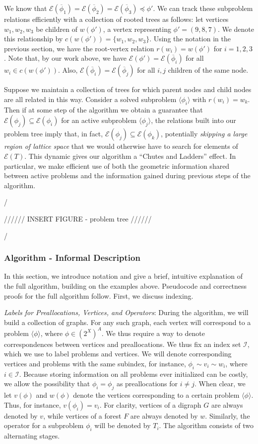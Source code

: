 \documentclass[11pt,reqno]{amsart}
\theoremstyle{definition}
\numberwithin{equation}{section}
\newcommand{\ol}{\overline}
\newcommand{\lag}{\langle}
\newcommand{\rag}{\rangle}
\newcommand{\pre}{\phi}
\newcommand{\prealloc}{(2^X)^A}
\newcommand{\sub}{\subseteq}
\newcommand{\fix}{\mathcal{E}}
\newcommand{\peq}{\preceq}
\newcommand{\toppre}{\ol{\pre}}
\begin{document}
We know that $\fix(\toppre_1) = \fix(\toppre_2) = \fix(\toppre_3) \peq \pre'$. 
We can track these subproblem relations efficiently with a collection of rooted trees as follows: let vertices $w_1,w_2,w_3$ be children of $w(\pre')$, a vertex representing $\pre' = (9,8,7)$. 
We denote this relationship by $c(w(\pre')) = \{w_1,w_2,w_3\}$.
Using the notation in the previous section, we have the root-vertex relation $r(w_i) = w(\pre')$ for $i = 1,2,3$. 
Note that, by our work above, we have $\fix(\pre') = \fix(\toppre_i)$ for all $w_i \in c(w(\pre'))$. 
Also, $\fix(\toppre_i) = \fix(\toppre_j)$ for all $i,j$ children of the same node. 

Suppose we maintain a collection of trees for which parent nodes and child nodes are all related in this way. 
Consider a solved subproblem $\lag \pre_i \rag$ with $r(w_i) = w_k$.
Then if at some step of the algorithm we obtain a guarantee that $\fix(\pre_j) \sub \fix(\pre_i)$ for an active subproblem $\lag \pre_j \rag$, the relations built into our problem tree imply that, in fact, $\fix(\pre_j) \sub \fix(\pre_k)$, potentially \emph{skipping a large region of lattice space} that we would otherwise have to search for elements of $\fix(T)$. 
This dynamic gives our algorithm a ``Chutes and Ladders'' effect. 
In particular, we make efficient use of both the geometric information shared between active problems and the information gained during previous steps of the algorithm. 

/

////// INSERT FIGURE - problem tree //////

/

\subsubsection{Algorithm - Informal Description} 

In this section, we introduce notation and give a brief, intuitive explanation of the full algorithm, building on the examples above.
Pseudocode and correctness proofs for the full algorithm follow. 
First, we discuss indexing. 

\emph{Labels for Preallocations, Vertices, and Operators}:
During the algorithm, we will build a collection of graphs.
For any such graph, each vertex will correspond to a problem $\lag \pre \rag$, where $\pre \in \prealloc$.
We thus require a way to denote correspondences between vertices and preallocations. 
We thus fix an index set $\mathcal{I}$, which we use to label problems and vertices.
We will denote corresponding vertices and problems with the same subindex, for instance, $\pre_i \sim v_i \sim w_i$, where $i \in \mathcal{I}$. 
Because storing information on all problems ever initialized can be costly, we allow the possibility that $\pre_i = \pre_j$ as preallocations for $i \not = j$.
When clear, we let $v(\pre)$ and $w(\pre)$ denote the vertices corresponding to a certain problem $\lag \pre \rag$.
Thus, for instance, $v(\pre_i) = v_i$.
For clarity, vertices of a digraph $G$ are always denoted by $v$, while vertices of a forest $F$ are always denoted by $w$.
Similarly, the operator for a subproblem $\pre_i$ will be denoted by $T_i$.
The algorithm consists of two alternating stages. 
\end{document}
